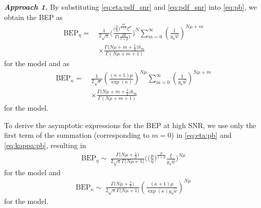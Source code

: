 \documentclass[journal,twocolumn]{IEEEtran}
\begin{document}
\textit{\textbf{Approach 1.}} By substituting \eqref{eq:eta:pdf_snr} and \eqref{eq:pdf_snr} into \eqref{eq:pb}, we obtain the \ac{BEP} as
\begin{align}
    \textrm{BEP}_{\eta} = \ & \frac{1}{2\sqrt{\pi}}\Bigg( \frac{\big(\frac{p}{\eta }\big)^{\frac{\mu  p}{1+p}}\xi^{\mu}}{\Gamma \big(\frac{\mu  p}{1+p}\big)} \Bigg)^N \sum _{m=0}^{\infty } 
    \left(\frac{1}{g_{\textrm{b}} \hat{w}}\right)^{N \mu + m} \nonumber \\
    & \times \frac{ \Gamma \big(N \mu + m +\frac{1}{2}\big) h_m}{  \Gamma (N \mu + m +1) } \label{eq:eta:pb}
\end{align}
for the \Ehm{} model and as
\begin{align}
    \textrm{BEP}_{\kappa} = \ & \frac{1}{2\sqrt{\pi}} \left(\frac{(\kappa +1) \mu}{\exp\left(\kappa\right)}\right)^{N \mu}\sum _{m=0}^{\infty }  \left(\frac{1}{g_{\textrm{b}} \hat{w} }\right)^{N \mu + m} \nonumber \\
    & \times \frac{ \Gamma \big(N \mu + m +\frac{1}{2}\big)k_m}{\Gamma (N \mu + m +1)} \label{eq:kappa:pb}
\end{align}
for the \km{} model.

To derive the asymptotic expressions for the \ac{BEP} at high \ac{SNR}, we use only the first term of the summation (corresponding to $m=0$) in \eqref{eq:eta:pb} and \eqref{eq:kappa:pb}, resulting in
\begin{align}\label{eq:eta:pb-asymp}
    \textrm{BEP}_{\eta} \sim \ \frac{\Gamma \big(N \mu +\frac{1}{2}\big)}{2\sqrt{\pi}  \Gamma \big(N \mu +1\big)}\bigg( \bigg(\frac{p}{\eta }\bigg)^{\frac{ p}{1+p}}\frac{\xi}{g_{\textrm{b}}\hat{w}} \bigg)^{N\mu}
\end{align}
for the \Ehm{} model and 
\begin{align}\label{eq:kappa:pb-asymp}
    \textrm{BEP}_{\kappa} \sim \ \frac{ \Gamma \big(N \mu  +\frac{1}{2}\big)}{2\sqrt{\pi} \Gamma \big(N \mu  +1\big)} \left(\frac{(\kappa +1) \mu}{\exp\left(\kappa\right) g_{\textrm{b}} \hat{w}}\right)^{N \mu}
\end{align}
for the \km{} model.
\end{document}
